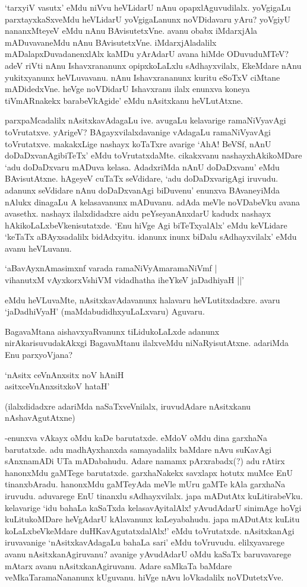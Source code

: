 `tarxyiV vasutx' eMdu niVvu heVLidarU nAnu opapxlAguvudilalx. yoVgigaLu parxtayxkaSxveMdu heVLidarU yoVgigaLanunx noVDidavaru yAru? yoVgiyU nananxMteyeV eMdu nAnu BAvisutetxVne. avanu obabx iMdarxjAla mADuvavaneMdu nAnu BAvisutetxVne. iMdarxjAladalilx mADalapxDuvadanenxlAlx kaMDu yArAdarU avana hiMde ODuvuduMTeV? adeV riVti nAnu Ishavxrananunx opipxkoLaLxlu sAdhayxvilalx, EkeMdare nAnu yukitxyanunx heVLuvavanu. nAnu Ishavxrananunx kuritu eSoTxV ciMtane mADidedxVne. heVge noVDidarU Ishavxranu ilalx enunxva koneya tiVmARnakekx barabeVkAgide' eMdu nAsitxkanu heVLutAtxne.

parxpaMcadalilx nAsitxkavAdagaLu ive. avugaLu kelavarige ramaNiVyavAgi toVrutatxve. yArigeV? BAgayxvilalxdavanige vAdagaLu ramaNiVyavAgi toVrutatxve. makakxLige nashayx koTaTxre avarige `AhA! BeVSf, nAnU doDaDxvanAgibiTeTx' eMdu toVrutatxdaMte. cikakxvanu nashayxhAkikoMDare `adu doDaDxvaru mADuva kelasa. AdadxriMda nAnU doDaDxvanu' eMdu BAvisutAtxne. hAgeyeV cuTaTx seVdidare, `adu doDaDxvarigAgi iruvudu. adanunx seVdidare nAnu doDaDxvanAgi biDuvenu' enunxva BAvaneyiMda nAlukx dinagaLu A kelasavanunx mADuvanu. adAda meVle noVDabeVku avana avasethx. nashayx ilalxdidadxre aidu peYseyanAnxdarU kadudx nashayx hAkikoLaLxbeVkenisutatxde. `Enu hiVge Agi biTeTxyalAlx' eMdu keVLidare `keTaTx aBAyxsadalilx bidAdxyitu. idanunx inunx biDalu sAdhayxvilalx' eMdu avanu heVLuvanu.

\begin{shloka}
`aBavAyxnAmasimxnf varada ramaNiVyAmaramaNiVmf |\\
vihanutxM vAyxkorxVshiVM vidadhatha iheYkeV jaDadhiyaH ||'
\end{shloka}

eMdu heVLuvaMte, nAsitxkavAdavanunx halavaru heVLutitxdadxre. avaru `jaDadhiVyaH' (maMdabudidhxyuLaLxvaru) Aguvaru.

BagavaMtana aishavxyaRvanunx tiLidukoLaLxde adanunx nirAkarisuvudakAkxgi BagavaMtanu ilalxveMdu niNaRyisutAtxne. adariMda Enu parxyoVjana?

\begin{shloka}
`nAsitx ceVnAnxsitx noV hAniH\\
asitxceVnAnxsitxkoV hataH'
\end{shloka}

(ilalxdidadxre adariMda naSaTxveVnilalx, iruvudAdare nAsitxkanu nAshavAgutAtxne)

-enunxva vAkayx oMdu kaDe barutatxde. eMdoV oMdu dina garxhaNa barutatxde. adu madhAyxhanxda samayadalilx baMdare nAvu suKavAgi sAnxnamADi UTa mADabahudu. Adare namamx pArxrabadx(?) adu rAtirx hanonxMdu gaMTege barutatxde. garxhaNakekx savxlapx hotutx muMce EnU tinanxbAradu. hanonxMdu gaMTeyAda meVle mUru gaMTe kAla garxhaNa iruvudu. aduvarege EnU tinanxlu sAdhayxvilalx. japa mADutAtx kuLitirabeVku. kelavarige `idu bahaLa kaSaTxda kelasavAyitalAlx! yAvudAdarU sinimAge hoVgi kuLitukoMDare heVgAdarU kAlavanunx kaLeyabahudu. japa mADutAtx kuLitu koLaLxbeVkeMdare duHKavAgutatxdalAlx!' eMdu toVrutatxde. nAsitxkanAgi iruvavanige `nAsitxkavAdagaLu bahaLa sari' eMdu toVruvudu. elilxyavarege avanu nAsitxkanAgiruvanu? avanige yAvudAdarU oMdu kaSaTx baruvavarege mAtarx avanu nAsitxkanAgiruvanu. Adare saMkaTa baMdare veMkaTaramaNananunx kUguvanu. hiVge nAvu loVkadalilx noVDutetxVve.

